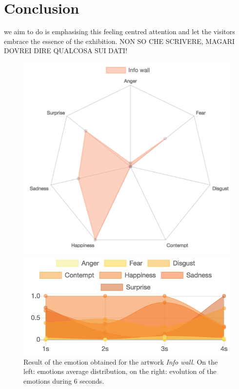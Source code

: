 \documentclass[journal, a4paper]{IEEEtran}
\begin{document}
\section{Conclusion}
 we aim to do is emphasising this feeling centred attention and let the visitors embrace the essence of the exhibition. NON SO CHE SCRIVERE, MAGARI DOVREI DIRE QUALCOSA SUI DATI!
\begin{figure}[!h]
  \centering
  \begin{minipage}[b]{0.24\textwidth}
    \includegraphics[width=\textwidth]{chart.png}
  \end{minipage}
  \hfill
  \begin{minipage}[b]{0.24\textwidth}
    \includegraphics[width=\textwidth]{emot.png}
  \end{minipage}
  \caption{Result of the emotion obtained for the artwork \textit{Info wall}. On the left: emotions average distribution, on the right: evolution of the emotions during 6 seconds.}
\end{figure}
\end{document}
